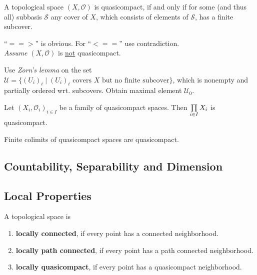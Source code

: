 \begin{theorem}
	A topological space $(X,\mathcal{O})$ is quasicompact, if and only if for some (and thus all) subbasis $\mathcal{S}$ any cover of $X$, which consists of elements of $\mathcal{S}$, has a finite subcover.
\end{theorem}

\begin{sketch}
	\enquote{$==>$} is obvious. For \enquote{$<==$} use contradiction.\\
	\textit{Assume} $(X,\mathcal{O})$ is \underline{not} quasicompact.
	\begin{tab}[1.3cm]
		Use \textit{Zorn's lemma} on the set $\mathcal{U} = \{(U_i)_i \mid (U_i)_i \text{ covers } X \text{ but no finite subcover}\}$, which is nonempty and partially ordered wrt. subcovers. Obtain maximal element $\mathcal{U}_0$. 
	\end{tab}
\end{sketch}

\begin{corollary}
	Let $(X_i, \mathcal{O}_i)_{i\in I}$ be a family of quasicompact spaces. Then $\prod \limits_{i \in I} X_i$ is quasicompact.
\end{corollary}

\begin{lemma}
	Finite colimits of quasicompact spaces are quasicompact.
\end{lemma}
\begin{sketch}
\end{sketch}


\newpage
\subsection{Countability, Separability and Dimension}

\subsection{Local Properties}
\begin{definition}
	A topological space is
	\begin{enumerate}[$\bullet$]
		\item{
			\textbf{locally connected}, if every point has a connected neighborhood.
		}
		\item{
			\textbf{locally path connected}, if every point has a path connected neighborhood.
		}
		\item{
			\textbf{locally quasicompact}, if every point has a quasicompact neighborhood.
		}
	\end{enumerate}
\end{definition}

